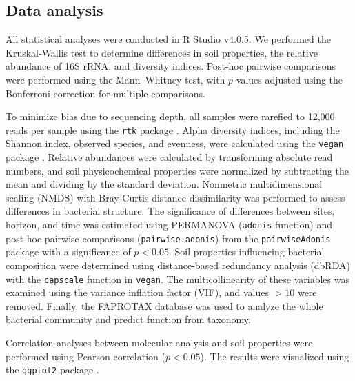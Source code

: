 \subsection{Data analysis}

All statistical analyses were conducted in R Studio v4.0.5. We performed the Kruskal-Wallis test to determine differences in soil properties, the relative abundance of 16S rRNA, and diversity indices. Post-hoc pairwise comparisons were performed using the Mann–Whitney test, with \(p\)-values adjusted using the Bonferroni correction for multiple comparisons.

To minimize bias due to sequencing depth, all samples were rarefied to 12,000 reads per sample using the \texttt{rtk} package \citep{Saary2017}. Alpha diversity indices, including the Shannon index, observed species, and evenness, were calculated using the \texttt{vegan} package \citep{Oksanen2013}. Relative abundances were calculated by transforming absolute read numbers, and soil physicochemical properties were normalized by subtracting the mean and dividing by the standard deviation. Nonmetric multidimensional scaling (NMDS) with Bray-Curtis distance dissimilarity was performed to assess differences in bacterial structure. The significance of differences between sites, horizon, and time was estimated using PERMANOVA (\texttt{adonis} function) and post-hoc pairwise comparisons (\texttt{pairwise.adonis}) from the \texttt{pairwiseAdonis} package \citep{MartinezArbizu2017} with a significance of \(p < 0.05\). Soil properties influencing bacterial composition were determined using distance-based redundancy analysis (dbRDA) with the \texttt{capscale} function in \texttt{vegan}. The multicollinearity of these variables was examined using the variance inflation factor (VIF), and values \(>10\) were removed. Finally, the FAPROTAX database \citep{Louca2016} was used to analyze the whole bacterial community and predict function from taxonomy.

Correlation analyses between molecular analysis and soil properties were performed using Pearson correlation (\(p < 0.05\)). The results were visualized using the \texttt{ggplot2} package \citep{Wickham2011}.


